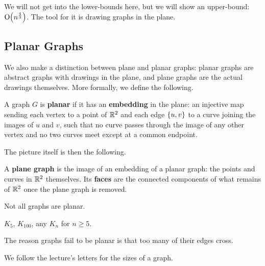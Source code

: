 We will not get into the lower-bounds here, but we will show an upper-bound: $\operatorname{O}\!\left( n^{\frac{4}{3}} \right)$. The tool for it is drawing graphs in the plane.

\subsection{Planar Graphs}

We also make a distinction between plane and planar graphs: planar graphs are abstract graphs with drawings in the plane, and plane graphs are the actual drawings themselves. More formally, we define the following.

\begin{boxdefinition}
    A graph $G$ is \textbf{planar} if it has an \textbf{embedding} in the plane: an injective map sending each vertex to a point of $\mathbb{R}^2$ and each edge $\left\{ u, v \right\}$ to a curve joining the images of $u$ and $v$, such that no curve passes through the image of any other vertex and no two curves meet except at a common endpoint.
\end{boxdefinition}

The picture itself is then the following.

\begin{boxdefinition}
    A \textbf{plane graph} is the image of an embedding of a planar graph: the points and curves in $\mathbb{R}^2$ themselves. Its \textbf{faces} are the connected components of what remains of $\mathbb{R}^2$ once the plane graph is removed.
\end{boxdefinition}

Not all graphs are planar.

\begin{boxnexample}
    $K_5$, $K_{100}$, any $K_n$ for $n \geq 5$.
    \begin{figure}[H]
        \centering
    \end{figure}
\end{boxnexample}

The reason graphs fail to be planar is that too many of their edges cross.

We follow the lecture's letters for the sizes of a graph.

